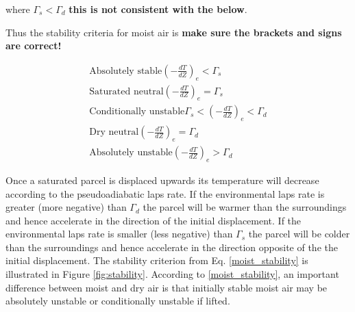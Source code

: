 where $\Gamma_s < \Gamma_d$ \cite{marshall} \textbf{this is not consistent with the below}. 

Thus the stability criteria for moist air is \textbf{make sure the brackets and signs are correct!}

\begin{equation}
\begin{gathered}
    \text{Absolutely stable} (-\frac{dT}{dZ})_e < \Gamma_s \\
    \text{Saturated neutral} (-\frac{dT}{dZ})_e = \Gamma_s \\
    \text{Conditionally unstable} \Gamma_s < (-\frac{dT}{dZ})_e < \Gamma_d \\
    \text{Dry neutral} (-\frac{dT}{dZ})_e  = \Gamma_d \\
    \text{Absolutely unstable} (-\frac{dT}{dZ})_e > \Gamma_d
    \label{moist_stability}
\end{gathered}
\end{equation}

Once a saturated parcel is displaced upwards its temperature will decrease according to the pseudoadiabatic laps rate. If the environmental laps rate is greater (more negative) than $\Gamma_d$ the parcel will be warmer than the surroundings and hence accelerate in the direction of the initial displacement. If the environmental laps rate is smaller (less negative) than $\Gamma_s$ the parcel will be colder than the surroundings and hence accelerate in the direction opposite of the the initial displacement. The stability criterion from Eq. \eqref{moist_stability} is illustrated in Figure \eqref{fig:stability}. According to \eqref{moist_stability}, an important difference between moist and dry air is that initially stable moist air may be absolutely unstable or conditionally unstable if lifted.  

